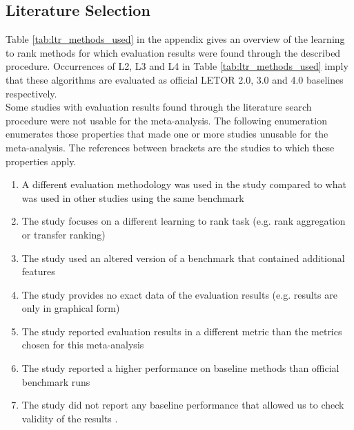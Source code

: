 \documentclass[english, authoryear, preprint]{elsarticle}
\begin{document}
\subsection{Literature Selection}
Table \ref{tab:ltr_methods_used} in the appendix gives an overview of the learning to rank methods for which evaluation results were found through the described procedure. Occurrences of L2, L3 and L4 in Table \ref{tab:ltr_methods_used} imply that these algorithms are evaluated as official LETOR 2.0, 3.0 and 4.0 baselines respectively.\\

Some studies with evaluation results found through the literature search procedure were not usable for the meta-analysis. The following enumeration enumerates those properties that made one or more studies unusable for the meta-analysis. The references between brackets are the studies to which these properties apply.

\begin{enumerate}
\item A different evaluation methodology was used in the study compared to what was used in other studies using the same benchmark \citep{Geng2011, Lin2012}
\item The study focuses on a different learning to rank task (e.g. rank aggregation or transfer ranking) \citep{De2011, De2010, Derhami2013, De2012, Chen2010, Ah-Pine2008, Wang2009c, De2013, Miao2013, Hoi2008, De2012b, Duh2011b, Argentini2012, Qin2010c, Volkovs2013, Desarkar2011, Pan2013, Lin2011b, Volkovs2012, Dammak2011}
\item The study used an altered version of a benchmark that contained additional features \citep{Bidoki2009, Ding2010}
\item The study provides no exact data of the evaluation results (e.g. results are only in graphical form) \citep{Wang2008, Wang2010, Xu2010, Kuo2009, Li2008, Xia2008, Zhou2011, Wu2011, Zhu2009, Karimzadehgan2011, Swersky2012, Pan2011, Ni2008, Ciaramita2008, Stewart2012, Petterson2009, Agarwal2010, Chang2009, Qin2008c, Adams2011, Sculley2009, Huang2008, Alejo2010, Sun2011, He2010b, Benbouzid2012, Geng2012, Chen2012, Xu2012, Shivaswamy2011}
\item The study reported evaluation results in a different metric than the metrics chosen for this meta-analysis \citep{Yu2009, Thuy2009, Pahikkala2009, Kersting2009, Mohan2011}
\item The study reported a higher performance on baseline methods than official benchmark runs \citep{Dubey2009, Banerjee2009, Peng2010b, Song2014, Bian2010, Bian2010b, Carvalho2008, Acharyya2012, Peng2010b, Tran2012, Asadi2013c}
\item The study did not report any baseline performance that allowed us to check validity of the results \citep{Chakrabarti2008, Wang2012b, Buffoni2011}.
\end{enumerate}
\end{document}
